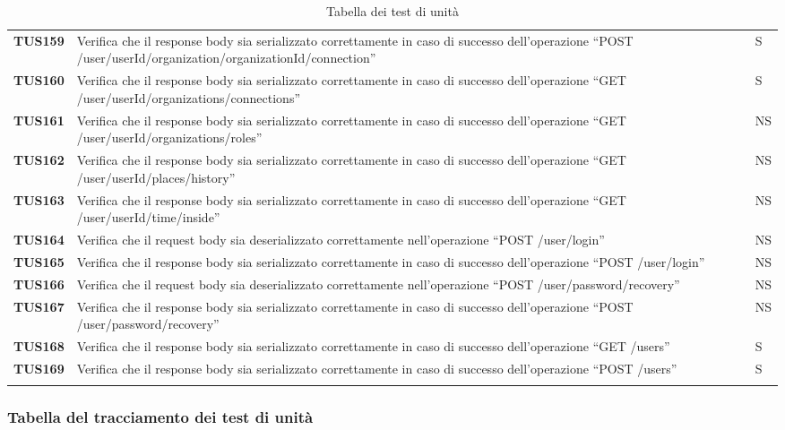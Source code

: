 \documentclass[../../piano-di-qualifica.tex]{subfiles}
\begin{document}
\begin{longtable}[H]{>{\centering\bfseries}m{3cm} >{}m{10cm} >{\centering\arraybackslash}m{3cm}}
  TUS159 & Verifica che il response body sia serializzato correttamente in caso di successo dell'operazione ``POST /user/{userId}/organization/{organizationId}/connection'' & S \\
  TUS160 & Verifica che il response body sia serializzato correttamente in caso di successo dell'operazione ``GET /user/{userId}/organizations/connections'' & S \\
  TUS161 & Verifica che il response body sia serializzato correttamente in caso di successo dell'operazione ``GET /user/{userId}/organizations/roles'' & NS \\
  TUS162 & Verifica che il response body sia serializzato correttamente in caso di successo dell'operazione ``GET /user/{userId}/places/history'' & NS \\
  TUS163 & Verifica che il response body sia serializzato correttamente in caso di successo dell'operazione ``GET /user/{userId}/time/inside'' & NS \\
  TUS164 & Verifica che il request body sia deserializzato correttamente nell'operazione ``POST /user/login'' & NS \\
  TUS165 & Verifica che il response body sia serializzato correttamente in caso di successo dell'operazione ``POST /user/login'' & NS \\
  TUS166 & Verifica che il request body sia deserializzato correttamente nell'operazione ``POST /user/password/recovery'' & NS \\
  TUS167 & Verifica che il response body sia serializzato correttamente in caso di successo dell'operazione ``POST /user/password/recovery'' & NS \\
  TUS168 & Verifica che il response body sia serializzato correttamente in caso di successo dell'operazione ``GET /users'' & S \\
  TUS169 & Verifica che il response body sia serializzato correttamente in caso di successo dell'operazione ``POST /users'' & S \\
  \rowcolor{white}
  \caption{Tabella dei test di unità}%
  \label{tab:test_di_unita}
\end{longtable}


\subsubsection{Tabella del tracciamento dei test di unità}%
\label{subsub:tabella_tracciamento_test_di_unita}
\end{document}
